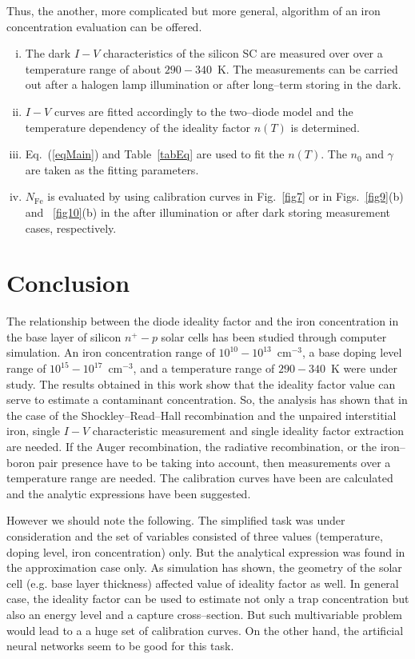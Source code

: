 \documentclass [sort&compress] {elsarticle}
\begin{document}
Thus, the another, more complicated but more general, algorithm of an iron concentration evaluation can be offered.
\begin{enumerate}[(i)]
\item The dark $I-V$ characteristics of the silicon SC are measured over over a temperature range of about $290-340$~K.
The measurements can be carried out  after a halogen lamp illumination or after long--term storing in the dark.
\item $I-V$ curves are fitted accordingly to the two--diode model and the temperature dependency of the ideality factor $n(T)$ is determined.
\item Eq.~(\ref{eqMain}) and Table~\ref{tabEq} are used to fit the $n(T)$.
 The $n_0$ and $\gamma$ are taken as the fitting parameters.
\item $N_\mathrm{Fe}$ is evaluated by using calibration curves in Fig.~\ref{fig7} or in Figs.~\ref{fig9}(b) and ~\ref{fig10}(b) in the
 after illumination or after dark storing measurement cases, respectively.
\end{enumerate}


\section{Conclusion}
The relationship between the diode ideality factor and the iron concentration in the base layer of silicon $n^+-p$ solar cells has been studied through computer simulation.
An iron concentration range of $10^{10}-10^{13}$~cm$^{-3}$, a base doping level range of $10^{15}-10^{17}$~cm$^{-3}$, and a temperature range of $290-340$~K were under study.
The results obtained in this work show that the ideality factor value can serve to estimate a contaminant concentration.
So, the analysis has shown that in the case of the Shockley--Read--Hall recombination and the unpaired interstitial iron,
single $I-V$ characteristic measurement and single ideality factor extraction  are needed.
If the Auger recombination, the radiative recombination, or the iron--boron pair presence have to be taking into account,
then measurements over a temperature range are needed.
The calibration curves have been are calculated and the analytic expressions have been suggested.

However we should note the following.
The simplified task was under consideration and the set of variables consisted of three values (temperature, doping level, iron concentration) only.
But the analytical expression was found in the  approximation case only.
As simulation has shown, the  geometry of the solar cell (e.g. base layer thickness) affected value of ideality factor as well.
In general case, the ideality factor can be used to estimate not only a trap concentration but also an energy level and a capture cross--section.
But such multivariable problem would lead to a a huge set of calibration curves.
On the other hand, the artificial neural networks seem to be good for this task.




\end{document}
